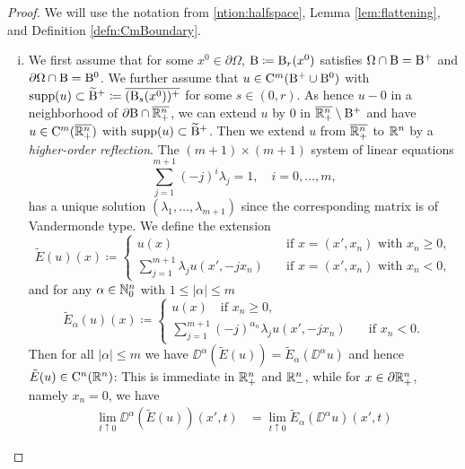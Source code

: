\begin{proof}
  We will use the notation from \ref{ntion:halfspace}, Lemma \ref{lem:flattening}, and Definition \ref{defn:CmBoundary}.
  \begin{enumerate}[i)]
    \item We first assume that for some $x^0 \in \partial \Omega$, $\mathrm{B} \coloneqq \mathrm{B}_r(x^0)$ satisfies $\Omega \cap \mathrm{B} = \mathrm{B}^+$ and $\partial\Omega \cap \mathrm{B} = \mathrm{B}^0$.
      We further assume that $u \in \mathrm{C}^m(\mathrm{B}^+ \cup \mathrm{B}^0)$ with $\operatorname{supp}(u) \subset \widetilde {\mathrm{B}}^+ \coloneqq \overline{(\mathrm{B}_s(x^0))^+}$ for some $s \in (0,r)$.
      As hence $u - 0$ in a neighborhood of $\partial\mathrm{B} \cap \overline{\mathbb{R}^n_+}$, we can extend $u$ by $0$ in $\overline{\mathbb{R}^n_+} \setminus \mathrm{B}^+$ and have $u \in \mathrm{C}^m(\overline{\mathbb{R}^n_+})$ with $\operatorname{supp}(u) \subset \widetilde {\mathrm{B}}^+$.
      Then we extend $u$ from $\overline{\mathbb{R}^n_+}$ to $\mathbb{R}^n$ by a \emph{higher-order reflection}.
      The $(m + 1)\times(m+1)$ system of linear equations
      \begin{equation}
        \label{eq:sle}
        \sum_{j = 1}^{m + 1} (-j)^i \lambda_j = 1, \quad i = 0,\dots,m,
      \end{equation}
      has a unique solution $(\lambda_1,\dots,\lambda_{m + 1})$ since the corresponding matrix is of Vandermonde type.
      We define the extension
      $$
      \tilde E(u) (x) \coloneqq 
      \begin{cases}
        u(x) &\quad\text{if } x = (x',x_n) \text{ with } x_n \geq 0,\\
        \sum_{j = 1}^{m + 1} \lambda_j u(x',-jx_n) &\quad\text{if } x = (x', x_n) \text{ with } x_n < 0,
      \end{cases}
      $$
      and for any $\alpha \in \mathbb{N}_0^n$ with $1 \leq |\alpha| \leq m$
      $$
      \tilde E_\alpha (u) (x) \coloneqq
      \begin{cases}
        u(x) \quad\text{if } x_n \geq 0,\\
        \sum_{j = 1}^{m + 1} (-j)^{\alpha_n}\lambda_j u(x',-jx_n) &\quad\text{if } x_n < 0.
      \end{cases}
      $$
      Then for all $|\alpha| \leq m$ we have $\DD^\alpha(\tilde E(u)) = \tilde E_\alpha(\DD^\alpha u)$ and hence $\tilde E (u) \in \mathrm{C}^n(\mathbb{R}^n)$:
      This is immediate in $\mathbb{R}^n_+$ and $\mathbb{R}^n_-$, while for $x \in \partial \mathbb{R}^n_+$, namely $x_n = 0$, we have
      \begin{align*}
        \lim_{t \uparrow 0 } \DD^\alpha(\tilde E(u))(x',t)
        &= \lim_{t \uparrow 0} \tilde E_\alpha(\DD^\alpha u)(x', t)

\end{align*}
\end{enumerate}
\end{proof}
